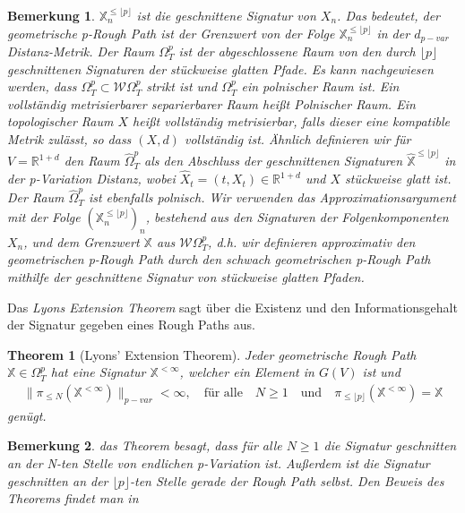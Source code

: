 \documentclass[12pt,titlepage,headsepline]{article}
\newtheorem{theorem}{Theorem}[section]
\newtheorem*{bemerkung*}{Bemerkung}
\begin{document}
      \begin{bemerkung*}
        \textup{
        $\mathbb{X}^{\leq \lfloor p \rfloor}_n$ ist die geschnittene Signatur von $X_n$. Das bedeutet, der geometrische p-Rough Path ist der Grenzwert von der Folge $\mathbb{X}^{\leq \lfloor p \rfloor}_n$ in der $d_{p-var}$ Distanz-Metrik. Der Raum $\Omega^p_T$ ist der abgeschlossene Raum von den durch $\lfloor p \rfloor$ geschnittenen Signaturen der stückweise glatten Pfade. Es kann nachgewiesen werden, dass $\Omega^p_T \subset \mathcal{W}\Omega^p_T$ strikt ist und $\Omega^p_T$ ein polnischer Raum ist. Ein vollständig metrisierbarer separierbarer Raum heißt Polnischer Raum. Ein topologischer Raum $X$ heißt vollständig metrisierbar, falls dieser eine kompatible Metrik zulässt, so dass $(X,d)$ vollständig ist.
        Ähnlich definieren wir für $V = \mathbb{R}^{1+d}$ den Raum $\hat{\Omega}^p_T$ als den Abschluss der geschnittenen Signaturen $\hat{\mathbb{X}}^{\leq \lfloor p\rfloor}$ in der p-Variation Distanz, wobei $\hat{X}_t = (t,X_t) \in \mathbb{R}^{1+d}$ und $X$ stückweise glatt ist. Der Raum $\hat{\Omega}^p_T$ ist ebenfalls polnisch. Wir verwenden das Approximationsargument mit der Folge $(\mathbb{X}^{\leq \lfloor p \rfloor}_n)_n$,
        bestehend aus den Signaturen der Folgenkomponenten $X_n$, und dem Grenzwert $\mathbb{X}$ aus $\mathcal{W}\Omega_T^p$, d.h. wir definieren approximativ den geometrischen p-Rough Path durch den schwach geometrischen p-Rough Path mithilfe der geschnittene Signatur von stückweise glatten Pfaden.
        }
      \end{bemerkung*}
      Das \textit{Lyons Extension Theorem} sagt über die Existenz und den Informationsgehalt der Signatur gegeben eines Rough Paths aus.
      \begin{theorem}[Lyons' Extension Theorem]
        Jeder geometrische Rough Path $\mathbb{X} \in \Omega^p_T$ hat eine Signatur $\mathbb{X}^{<\infty}$, welcher ein Element in $G(V)$ ist und
        \begin{align*}
          \lVert \pi_{\leq N}(\mathbb{X}^{<\infty})\rVert_{p-var} < \infty, \quad \text{für alle} \quad N\geq 1 \quad \text{und} \quad \pi_{\leq\lfloor p\rfloor}(\mathbb{X}^{<\infty}) = \mathbb{X}
        \end{align*}
        genügt.
      \end{theorem}
      \begin{bemerkung*}
        \textup{
        das Theorem besagt, dass für alle $N \geq 1$ die Signatur geschnitten an der N-ten Stelle von endlichen p-Variation ist. Außerdem ist die Signatur geschnitten an der $\lfloor p\rfloor$-ten Stelle gerade der Rough Path selbst. Den Beweis des Theorems findet man in \cite{lyons_differential_2007, Theorem 3.7}
        }
      \end{bemerkung*}
\end{document}
